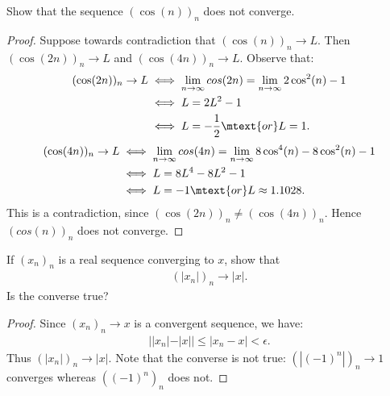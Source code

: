 \documentclass[10pt,twoside,openany]{memoir}
\begin{document}
    \begin{exercise}
        Show that the sequence $(\cos(n))_n$ does not converge.
    \end{exercise}
        \begin{proof}
            Suppose towards contradiction that $(\cos(n))_n \rightarrow L$. Then $(\cos(2n))_n \rightarrow L$ and $(\cos(4n))_n \rightarrow L$. Observe that:
                \begin{equation*}
                \begin{split}
                    (\cos(2n))_n \rightarrow L 
                    & \iff \lim_{n\rightarrow \infty}cos(2n) = \lim_{n \rightarrow \infty}2\cos^2(n) - 1 \\
                    & \iff L = 2L^2 - 1 \\
                    & \iff L = -\frac{1}{2} \mtext{or} L = 1.
                \end{split}
                \end{equation*}
                \begin{equation*}
                \begin{split}
                    (\cos(4n))_n \rightarrow L
                    & \iff \lim_{n \rightarrow \infty}cos(4n) = \lim_{n \rightarrow \infty} 8\cos^4(n) - 8\cos^2(n) - 1 \\
                    & \iff L = 8L^4 - 8L^2 - 1 \\
                    & \iff L = -1 \mtext{or} L \approx 1.1028.
                \end{split}
                \end{equation*}
            This is a contradiction, since $(\cos(2n))_n \neq (\cos(4n))_n$. Hence $(cos(n))_n$ does not converge.
        \end{proof}
    \begin{exercise}
        If $(x_n)_n$ is a real sequence converging to $x$, show that 
            \begin{equation*}
            \begin{split}
                (|x_n|)_n \rightarrow |x|.
            \end{split}
            \end{equation*}
        Is the converse true?
    \end{exercise}
        \begin{proof}
            Since $(x_n)_n \rightarrow x$ is a convergent sequence, we have:
                \begin{equation*}
                \begin{split}
                    ||x_n| - |x|| \leq |x_n - x| < \epsilon.
                \end{split}
                \end{equation*}
            Thus $(|x_n|)_n \rightarrow |x|$. Note that the converse is not true: $(|(-1)^n|)_n \rightarrow 1$ converges whereas $((-1)^n)_n$ does not. 
        \end{proof}
\end{document}

